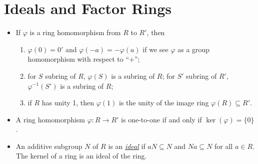 \documentclass{article}
\newcommand{\df}[1]{\ul{\textit{#1}}}
\renewcommand{\phi}{\varphi}
\begin{document}
\section{Ideals and Factor Rings}
\begin{itemize}
    \item If $\phi$ is a ring homomorphism from $R$ to $R'$, then
    \begin{enumerate}[label=(\alph*)]
        \item $\phi(0) = 0'$ and $\phi(-a) = - \phi(a)$ if we see $\phi$ as a group homomorphism with respect to ``$+$'';
        \item for $S$ subring of $R$, $\phi(S)$ is a subring of $R$; for $S'$ subring of $R'$, $\phi^{-1}(S')$ is a subring of $R$;
        \item if $R$ has unity 1, then $\phi(1)$ is the unity of the image ring $\phi(R) \subseteq R'$.
    \end{enumerate}
    \item A ring homomorphism $\phi: R \to R'$ is one-to-one if and only if $\ker(\phi) = \{0\}$.
    \item An additive subgroup $N$ of $R$ is an \df{ideal} if $aN \subseteq N$ and $Na \subseteq N$ for all $a \in R$. The kernel of a ring is an ideal of the ring.


\end{itemize}
\end{document}

